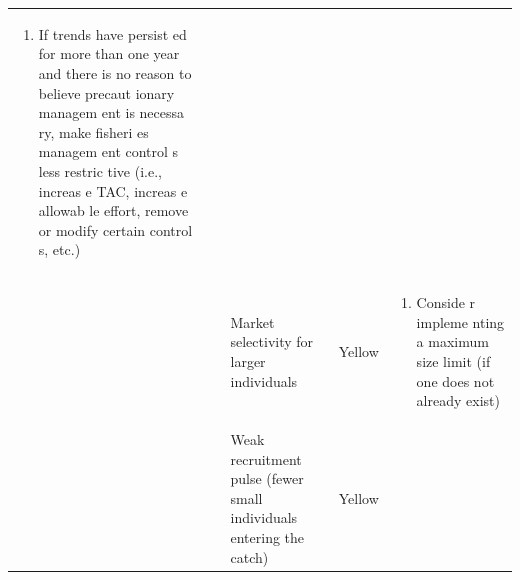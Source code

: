 \documentclass[]{book}
\providecommand{\tightlist}{%
  \setlength{\itemsep}{0pt}\setlength{\parskip}{0pt}}
\begin{document}
\begin{longtable}[]{@{}lllll@{}}
\begin{minipage}[t]{0.19\columnwidth}
\begin{enumerate}
\def\labelenumi{\arabic{enumi}.}
\setcounter{enumi}{1}
\tightlist
\item
  If trends have persist ed for more than one year and there is no
  reason to believe precaut ionary managem ent is necessa ry, make
  fisheri es managem ent control s less restric tive (i.e., increas e
  TAC, increas e allowab le effort, remove or modify certain control s,
  etc.)
\end{enumerate}\strut
\end{minipage}\tabularnewline
\begin{minipage}[t]{0.19\columnwidth}\raggedright\strut
\strut
\end{minipage} & \begin{minipage}[t]{0.19\columnwidth}\raggedright\strut
\strut
\end{minipage} & \begin{minipage}[t]{0.19\columnwidth}\raggedright\strut
Market selectivity for larger individuals\strut
\end{minipage} & \begin{minipage}[t]{0.19\columnwidth}\raggedright\strut
Yellow\strut
\end{minipage} & \begin{minipage}[t]{0.19\columnwidth}\raggedright\strut
\begin{enumerate}
\def\labelenumi{\arabic{enumi}.}
\tightlist
\item
  Conside r impleme nting a maximum size limit (if one does not already
  exist)
\end{enumerate}\strut
\end{minipage}\tabularnewline
\begin{minipage}[t]{0.19\columnwidth}\raggedright\strut
\strut
\end{minipage} & \begin{minipage}[t]{0.19\columnwidth}\raggedright\strut
\strut
\end{minipage} & \begin{minipage}[t]{0.19\columnwidth}\raggedright\strut
Weak recruitment pulse (fewer small individuals entering the
catch)\strut
\end{minipage} & \begin{minipage}[t]{0.19\columnwidth}\raggedright\strut
Yellow\strut
\end{minipage} & \begin{minipage}[t]{0.19\columnwidth}\raggedright\strut
\begin{enumerate}
\def\labelenumi{\arabic{enumi}.}

\end{enumerate}
\end{minipage}
\end{longtable}
\end{document}

